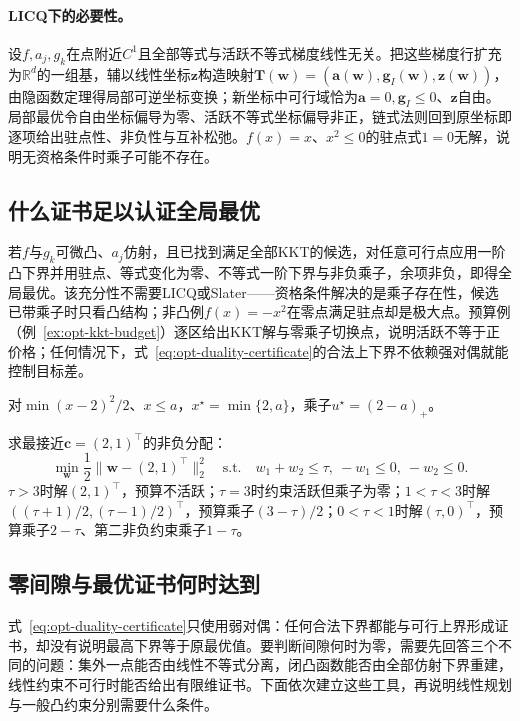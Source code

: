 \paragraph{LICQ下的必要性。}
设$f,a_j,g_k$在点附近$C^1$且全部等式与活跃不等式梯度线性无关。把这些梯度行扩充为$\mathbb R^d$的一组基，辅以线性坐标$\bm z$构造映射$\bm T(\bm w)=(\bm a(\bm w),\bm g_I(\bm w),\bm z(\bm w))$，由隐函数定理得局部可逆坐标变换；新坐标中可行域恰为$\bm a=0,\bm g_I\leq0$、$\bm z$自由。局部最优令自由坐标偏导为零、活跃不等式坐标偏导非正，链式法则回到原坐标即逐项给出驻点性、非负性与互补松弛。$f(x)=x$、$x^2\leq0$的驻点式$1=0$无解，说明无资格条件时乘子可能不存在。

\subsection{什么证书足以认证全局最优}

若$f$与$g_k$可微凸、$a_j$仿射，且已找到满足全部KKT的候选，对任意可行点应用一阶凸下界并用驻点、等式变化为零、不等式一阶下界与非负乘子，余项非负，即得全局最优。该充分性不需要LICQ或Slater——资格条件解决的是乘子存在性，候选已带乘子时只看凸结构；非凸例$f(x)=-x^2$在零点满足驻点却是极大点。预算例（例~\ref{ex:opt-kkt-budget}）逐区给出KKT解与零乘子切换点，说明活跃不等于正价格；任何情况下，式~\eqref{eq:opt-duality-certificate}的合法上下界不依赖强对偶就能控制目标差。

\begin{example}[活跃约束与预算例]
\label{ex:opt-scalar-active-constraint}
对$\min(x-2)^2/2$、$x\leq a$，$x^\star=\min\{2,a\}$，乘子$u^\star=(2-a)_+$。
\end{example}

\begin{example}[非负预算分配]
\label{ex:opt-kkt-budget}
求最接近$\bm c=(2,1)^\top$的非负分配：
\[
 \min_{\bm w}\frac12\|\bm w-(2,1)^\top\|_2^2
 \quad\text{s.t.}\quad w_1+w_2\leq\tau,\ -w_1\leq0,\ -w_2\leq0.
\]
$\tau>3$时解$(2,1)^\top$，预算不活跃；$\tau=3$时约束活跃但乘子为零；$1<\tau<3$时解$((\tau+1)/2,(\tau-1)/2)^\top$，预算乘子$(3-\tau)/2$；$0<\tau<1$时解$(\tau,0)^\top$，预算乘子$2-\tau$、第二非负约束乘子$1-\tau$。
\end{example}

\subsection{零间隙与最优证书何时达到}
\label{sec:opt-duality}
\label{sec:opt-affine-certificates}

式~\eqref{eq:opt-duality-certificate}只使用弱对偶：任何合法下界都能与可行上界形成证书，却没有说明最高下界等于原最优值。要判断间隙何时为零，需要先回答三个不同的问题：集外一点能否由线性不等式分离，闭凸函数能否由全部仿射下界重建，线性约束不可行时能否给出有限维证书。下面依次建立这些工具，再说明线性规划与一般凸约束分别需要什么条件。

